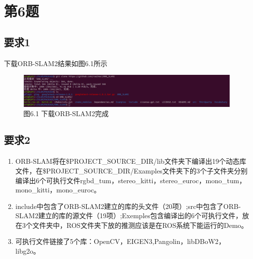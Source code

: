 \documentclass[40pt,a4paper，UTF8]{ctexart}
\begin{document}
\paragraph{}


\section{第6题}
\subsection{要求1} 
\paragraph{}
下载ORB-SLAM2结果如图6.1所示
\begin{figure}[H]
\centering
\includegraphics[width=4.8in]{ch1_6_1.png} {图6.1 下载ORB-SLAM2完成}
\end{figure}

\paragraph{}

\subsection{要求2} 
\paragraph{}
\begin{enumerate}
\item ORB-SLAM将在\${PROJECT\_SOURCE\_DIR}/lib文件夹下编译出19个动态库文件，在\${PROJECT\_SOURCE\_DIR}/Examples文件夹下的3个子文件夹分别编译出6个可执行文件rgbd\_tum，stereo\_kitti，stereo\_euroc，mono\_tum，mono\_kitti，mono\_euroc。
\item include中包含了ORB-SLAM2建立的库的头文件（20项）;src中包含了ORB-SLAM2建立的库的源文件（19项）;Exemples包含编译出的6个可执行文件，放在3个文件夹中，ROS文件夹下放的推测应该是在ROS系统下能运行的Demo。
\item 可执行文件链接了5个库：OpenCV，EIGEN3,Pangolin，libDBoW2，libg2o。
\end{enumerate}
\end{document}
